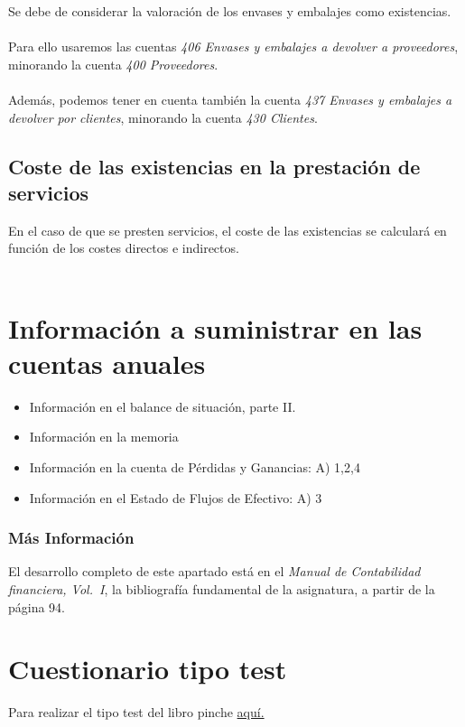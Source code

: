 \documentclass[a4paper,12pt]{article}
\begin{document}
Se debe de considerar la valoración de los envases y embalajes como existencias.\\\\
Para ello usaremos las cuentas \textit{406 Envases y embalajes a devolver a proveedores}, minorando la cuenta  \textit{400 Proveedores}.\\\\
Además, podemos tener en cuenta también la cuenta \textit{437 Envases y embalajes a devolver por clientes}, minorando la cuenta \textit{430 Clientes}.


\subsection{Coste de las existencias en la prestación de servicios}

En el caso de que se presten servicios, el coste de las existencias se calculará en función de los costes directos e indirectos.\\\\

\section{Información a suministrar en las cuentas anuales}

\begin{itemize}
    \item Información en el balance de situación, parte II.
    \item Información en la memoria
    \item Información en la cuenta de Pérdidas y Ganancias: A) 1,2,4
    \item Información en el Estado de Flujos de Efectivo: A) 3
\end{itemize}

\subsubsection*{Más Información}
El desarrollo completo de este apartado está en el \emph{Manual de Contabilidad
financiera, Vol.~I}, la bibliografía fundamental de la asignatura, a partir de la
página 94.

\newpage
\section{Cuestionario tipo test}
Para realizar el tipo test del libro pinche \href{https://elblogdeismael.github.io/Subjects/Third/CF1/Tests/testT2Libro.html}{aquí.}
\end{document}
